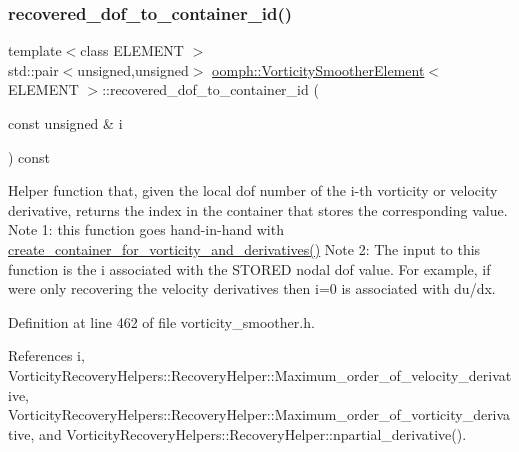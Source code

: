 \subsubsection{\texorpdfstring{recovered\+\_\+dof\+\_\+to\+\_\+container\+\_\+id()}{recovered\_dof\_to\_container\_id()}}
{\footnotesize\ttfamily template$<$class E\+L\+E\+M\+E\+NT $>$ \\
std\+::pair$<$unsigned,unsigned$>$ \hyperlink{classoomph_1_1VorticitySmootherElement}{oomph\+::\+Vorticity\+Smoother\+Element}$<$ E\+L\+E\+M\+E\+NT $>$\+::recovered\+\_\+dof\+\_\+to\+\_\+container\+\_\+id (\begin{DoxyParamCaption}\item[{const unsigned \&}]{i }\end{DoxyParamCaption}) const\hspace{0.3cm}{\ttfamily [inline]}}



Helper function that, given the local dof number of the i-\/th vorticity or velocity derivative, returns the index in the container that stores the corresponding value. Note 1\+: this function goes hand-\/in-\/hand with \hyperlink{classoomph_1_1VorticitySmootherElement_a84300b8d30090a7275a1e0233546b683}{create\+\_\+container\+\_\+for\+\_\+vorticity\+\_\+and\+\_\+derivatives()} Note 2\+: The input to this function is the i associated with the S\+T\+O\+R\+ED nodal dof value. For example, if we\textquotesingle{}re only recovering the velocity derivatives then i=0 is associated with du/dx. 



Definition at line 462 of file vorticity\+\_\+smoother.\+h.



References i, Vorticity\+Recovery\+Helpers\+::\+Recovery\+Helper\+::\+Maximum\+\_\+order\+\_\+of\+\_\+velocity\+\_\+derivative, Vorticity\+Recovery\+Helpers\+::\+Recovery\+Helper\+::\+Maximum\+\_\+order\+\_\+of\+\_\+vorticity\+\_\+derivative, and Vorticity\+Recovery\+Helpers\+::\+Recovery\+Helper\+::npartial\+\_\+derivative().

\mbox{\label{classoomph_1_1VorticitySmootherElement_abec3461fcb00b7cbab8aee26f996c1ed}} 
